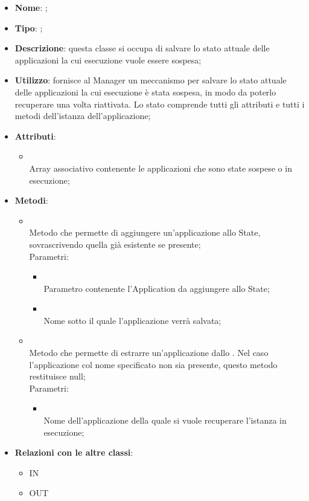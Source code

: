 \begin{itemize}
	\item \textbf{Nome}: ;
	\item \textbf{Tipo}: ;
	\item \textbf{Descrizione}: questa classe si occupa di salvare lo stato attuale delle applicazioni la cui esecuzione vuole essere sospesa;
	\item \textbf{Utilizzo}: fornisce al Manager un meccanismo per salvare lo stato attuale delle applicazioni la cui esecuzione è stata sospesa, in modo da poterlo recuperare una volta riattivata. Lo stato comprende tutti gli attributi e tutti i metodi dell'istanza dell'applicazione;
	\item \textbf{Attributi}:
	\begin{itemize}
		\item[]  \\
		Array associativo contenente le applicazioni che sono state sospese o in esecuzione;
	\end{itemize}
	\item \textbf{Metodi}:
	\begin{itemize}
		\item[]  \\
		Metodo che permette di aggiungere un'applicazione allo State, sovrascrivendo quella già esistente se presente;\\
		Parametri:
		\begin{itemize}
			\item {} \\
			Parametro contenente l'Application da aggiungere allo State;
			\item {} \\
			Nome sotto il quale l'applicazione verrà salvata;
		\end{itemize}
		\item[]  \\
		Metodo che permette di estrarre un'applicazione dallo . Nel caso l'applicazione col nome specificato non sia presente, questo metodo restituisce null;\\
		Parametri:
		\begin{itemize}
			\item {} \\
			Nome dell'applicazione della quale si vuole recuperare l'istanza in esecuzione;
		\end{itemize}
	\end{itemize}
	\item \textbf{Relazioni con le altre classi}:
	\begin{itemize}
		\item IN \hyperlink{Manager_label}{}
		\item OUT \hyperlink{Application_label}{}
	\end{itemize}
\end{itemize}
\FloatBarrier


